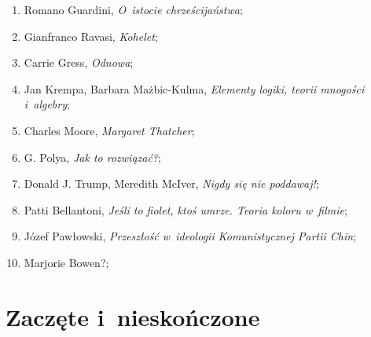 \documentclass[a4paper,11pt]{article}
\begin{document}
\begin{enumerate}
\item Romano Guardini, \textit{O~istocie chrześcijaństwa};

\item Gianfranco Ravasi, \textit{Kohelet};

\item Carrie Gress, \textit{Odnowa};

\item Jan Krempa, Barbara Mażbic-Kulma, \textit{Elementy logiki, teorii
    mnogości i~algebry};

\item Charles Moore, \textit{Margaret Thatcher};

\item G. Polya, \textit{Jak to rozwiązać?};

\item Donald J. Trump, Meredith McIver, \textit{Nigdy się nie poddawaj!};

\item Patti Bellantoni, \textit{Jeśli to fiolet, ktoś umrze. Teoria koloru
    w~filmie};

\item Józef Pawłowski, \textit{Przeszłość w~ideologii Komunistycznej Partii
    Chin};

\item Marjorie Bowen?;































\end{enumerate}










\newpage
\section{Zaczęte i~nieskończone}

\vspace{\spaceTwo}
\end{document}
